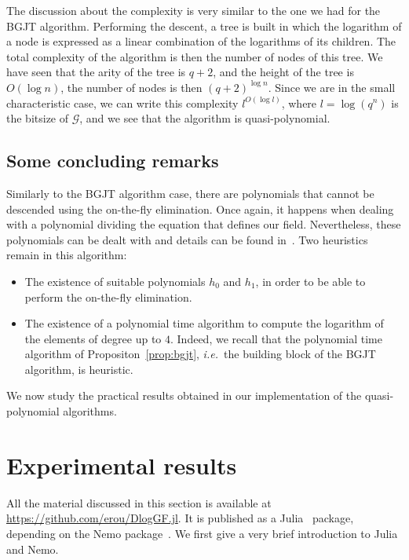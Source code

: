 \documentclass[a4paper,11pt]{article}
\theoremstyle{break}
\theoremstyle{sc}
\theoremstyle{definition}
\theoremstyle{remark}
\newcommand{\ie}{\emph{i.e.\ }}
\begin{document}
The discussion about the complexity is very similar to the one we had for the
BGJT algorithm. Performing the
descent, a tree is built in which the logarithm of a node is expressed
as a linear combination of the logarithms of its children. The total complexity of the algorithm
is then the number of nodes of this tree. We have seen that the arity of the
tree is $q+2$, and the height of the tree is $O(\log n)$, the number of nodes
is then $(q+2)^{\log n}$. Since we are in the small characteristic case, we
can write this complexity $l^{O(\log l)}$, where $l=\log(q^n)$ is the bitsize of
$\mathcal G$, and we see that the algorithm is quasi-polynomial.

\subsection{Some concluding remarks}

Similarly to the BGJT algorithm case, there are polynomials that cannot be
descended using the on-the-fly elimination. Once again, it happens when
dealing with a polynomial dividing the equation that defines our field.
Nevertheless, these polynomials can be dealt with and details can be found
in~\cite{GKZ14}. Two heuristics remain in this algorithm:

\begin{itemize}
  \item The existence of suitable polynomials $h_0$ and $h_1$, in order to be
    able to perform the on-the-fly elimination.
  \item The existence of a polynomial time algorithm to compute the logarithm
    of the elements of degree up to $4$. Indeed, we recall that the polynomial
    time algorithm of Propositon~\ref{prop:bgjt}, \ie the building block of the
    BGJT algorithm, is heuristic.
\end{itemize}

We now study the practical results obtained in our implementation of the
quasi-polynomial algorithms.
    
\section{Experimental results}
\label{sec:results}

All the material discussed in this section is available at
\url{https://github.com/erou/DlogGF.jl}. It is published as a
Julia~\cite{Julia} package, depending on the Nemo package~\cite{Nemo}. We first give
a very brief introduction to Julia and Nemo.
\end{document}
